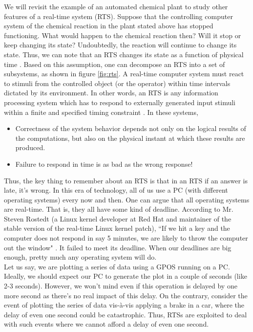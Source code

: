 \documentclass[12pt]{report}
\begin{document}
We will revisit the example of an automated chemical plant to study other features of a real-time system (RTS). Suppose that the controlling computer system of the chemical reaction in the plant stated above has stopped functioning. What would happen to the chemical reaction then? Will it stop or keep changing its state? Undoubtedly, the reaction will continue to change its state. Thus, we can note that an RTS changes its state as a function of physical time \cite{rts}. Based on this assumption, one can decompose an RTS into a set of subsystems, as shown in figure \ref{fig:rts}. A real-time computer system must react to stimuli from the controlled object (or the operator) within time intervals dictated by its environment. In other words, an RTS is any information processing system which has to respond to externally generated input stimuli within a finite and specified timing constraint \cite{unsw}. In  these systems, 
\begin{itemize}
  \setlength\itemsep{-0.2em}
    \item Correctness of the system behavior depends not only on the logical results of the computations, but also on the physical instant at which these results are produced. 
    \item Failure to respond in time is as bad as the wrong response! 
\end{itemize}
Thus, the key thing to remember about an RTS is that in an RTS if an answer is late, it's wrong. In this era of technology, all of us use a PC (with different operating systems) every now and then. One can argue that all operating systems are real-time. That is, they all have some kind of deadline. According to  Mr. Steven Rostedt (a Linux kernel developer at Red Hat and maintainer of the stable version of the real-time Linux kernel patch), ``If we hit a key and the computer does not respond in say 5 minutes, we are likely to throw the computer out the window" \cite{rtlinux}. It failed to meet its deadline. When our deadlines are big enough, pretty much any operating system will do. \\

Let us say, we are plotting a series of data using a GPOS running on a PC. Ideally, we should expect our PC to generate the plot in a couple of seconds (like 2-3 seconds). However, we won't mind even if this operation is delayed by one more second as there's no real impact of this delay. On the contrary, consider the event of plotting the series of data vis-\`a-vis applying a brake in a car, where the delay of even one second could be catastrophic. Thus, RTSs are exploited to deal with such events where we cannot afford a delay of even one second. 
\end{document}

